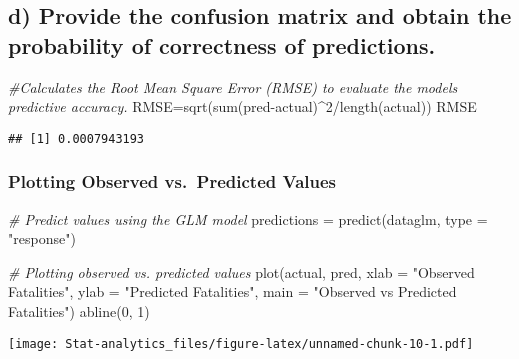 \documentclass[
]{article}
\newenvironment{Shaded}{\begin{snugshade}}{\end{snugshade}}
\newcommand{\AttributeTok}[1]{\textcolor[rgb]{0.77,0.63,0.00}{#1}}
\newcommand{\CommentTok}[1]{\textcolor[rgb]{0.56,0.35,0.01}{\textit{#1}}}
\newcommand{\DecValTok}[1]{\textcolor[rgb]{0.00,0.00,0.81}{#1}}
\newcommand{\FunctionTok}[1]{\textcolor[rgb]{0.00,0.00,0.00}{#1}}
\newcommand{\NormalTok}[1]{#1}
\newcommand{\OtherTok}[1]{\textcolor[rgb]{0.56,0.35,0.01}{#1}}
\newcommand{\SpecialCharTok}[1]{\textcolor[rgb]{0.00,0.00,0.00}{#1}}
\newcommand{\StringTok}[1]{\textcolor[rgb]{0.31,0.60,0.02}{#1}}
\begin{document}
\hypertarget{d-provide-the-confusion-matrix-and-obtain-the-probability-of-correctness-of-predictions.}{%
\subsection{d) Provide the confusion matrix and obtain the probability
of correctness of
predictions.}\label{d-provide-the-confusion-matrix-and-obtain-the-probability-of-correctness-of-predictions.}}

\begin{Shaded}
\begin{Highlighting}[]
\CommentTok{\#Calculates the Root Mean Square Error (RMSE) to evaluate the model\textquotesingle{}s predictive accuracy.}
\NormalTok{RMSE}\OtherTok{=}\FunctionTok{sqrt}\NormalTok{(}\FunctionTok{sum}\NormalTok{(pred}\SpecialCharTok{{-}}\NormalTok{actual)}\SpecialCharTok{\^{}}\DecValTok{2}\SpecialCharTok{/}\FunctionTok{length}\NormalTok{(actual))}
\NormalTok{RMSE}
\end{Highlighting}
\end{Shaded}

\begin{verbatim}
## [1] 0.0007943193
\end{verbatim}

\hypertarget{plotting-observed-vs.-predicted-values}{%
\subsubsection{Plotting Observed vs.~Predicted
Values}\label{plotting-observed-vs.-predicted-values}}

\begin{Shaded}
\begin{Highlighting}[]
\CommentTok{\# Predict values using the GLM model}
\NormalTok{predictions }\OtherTok{=} \FunctionTok{predict}\NormalTok{(dataglm, }\AttributeTok{type =} \StringTok{"response"}\NormalTok{)}

\CommentTok{\# Plotting observed vs. predicted values}
\FunctionTok{plot}\NormalTok{(actual, pred, }\AttributeTok{xlab =} \StringTok{"Observed Fatalities"}\NormalTok{, }\AttributeTok{ylab =} \StringTok{"Predicted Fatalities"}\NormalTok{, }\AttributeTok{main =} \StringTok{"Observed vs Predicted Fatalities"}\NormalTok{)}
\FunctionTok{abline}\NormalTok{(}\DecValTok{0}\NormalTok{, }\DecValTok{1}\NormalTok{)}
\end{Highlighting}
\end{Shaded}

\texttt{[image: Stat-analytics\_files/figure-latex/unnamed-chunk-10-1.pdf]}
\end{document}
